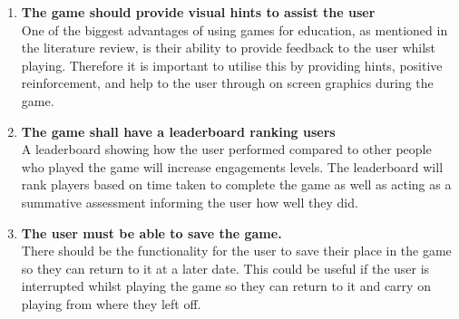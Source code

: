 \documentclass[12pt,a4paper]{report}
\begin{document}
\begin{enumerate}[label*=\arabic*]
            
            	  \item \textbf{The game should provide visual hints to assist the user}\\
One of the biggest advantages of using games for education, as mentioned in the literature review, is their ability to provide feedback to the user whilst playing. Therefore it is important to utilise this by providing hints, positive reinforcement, and help to the user through on screen graphics during the game.
 

	  \item \textbf{The game shall have a leaderboard ranking users}\\
A leaderboard showing how the user performed compared to other people who played the game will increase engagements levels. The leaderboard will rank players based on time taken to complete the game as well as acting as a summative assessment informing the user how well they did. 

           

            	  \item \textbf{The user must be able to save the game.}\\
There should be the functionality for the user to save their place in the game so they can return to it at a later date. This could be useful if the user is interrupted whilst playing the game so they can return to it and carry on playing from where they left off.
            

            
            
        \end{enumerate}
        
\end{document}
